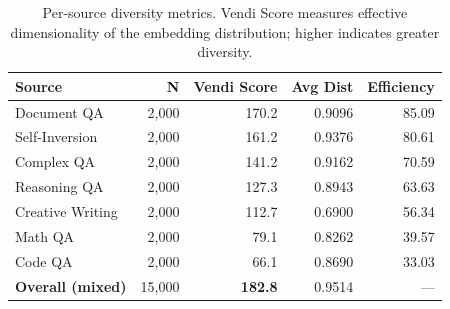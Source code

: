 \begin{table}[t]
\centering
\caption{Per-source diversity metrics. Vendi Score measures effective dimensionality of the embedding distribution; higher indicates greater diversity.}
\label{tab:diversity_metrics}
\small
\begin{tabular}{lrrrr}
\toprule
\textbf{Source} & \textbf{N} & \textbf{Vendi Score} & \textbf{Avg Dist} & \textbf{Efficiency} \\
\midrule
Document QA & 2,000 & 170.2 & 0.9096 & 85.09 \\
Self-Inversion & 2,000 & 161.2 & 0.9376 & 80.61 \\
Complex QA & 2,000 & 141.2 & 0.9162 & 70.59 \\
Reasoning QA & 2,000 & 127.3 & 0.8943 & 63.63 \\
Creative Writing & 2,000 & 112.7 & 0.6900 & 56.34 \\
Math QA & 2,000 & 79.1 & 0.8262 & 39.57 \\
Code QA & 2,000 & 66.1 & 0.8690 & 33.03 \\
\midrule
\textbf{Overall (mixed)} & 15,000 & \textbf{182.8} & 0.9514 & --- \\
\bottomrule
\end{tabular}
\end{table}
